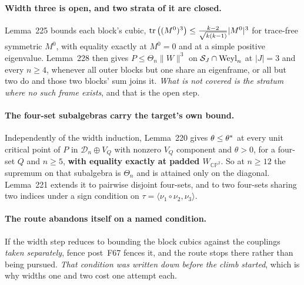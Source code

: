 \paragraph{Width three is open, and two strata of it are closed.} Lemma~225 bounds each block's cubic, $\operatorname{tr}\big((M^0)^3\big)\le\frac{k-2}{\sqrt{k(k-1)}}\lvert M^0\rvert^3$ for trace-free symmetric $M^0$, with equality exactly at $M^0=0$ and at a simple positive eigenvalue. Lemma~228 then gives $P\le\Theta_n\lVert W\rVert^3$ on $\mathcal S_J\cap\mathrm{Weyl}_n$ at $\lvert J\rvert=3$ and every $n\ge4$, whenever all outer blocks but one share an eigenframe, or all but two do and those two blocks' sum joins it. \emph{What is not covered is the stratum where no such frame exists}, and that is the open step.

\paragraph{The four-set subalgebras carry the target's own bound.} Independently of the width induction, Lemma~220 gives $\theta\le\theta^{*}$ at every unit critical point of $P$ in $\mathcal D_n\oplus V_Q$ with nonzero $V_Q$ component and $\theta>0$, for a four-set $Q$ and $n\ge5$, \textbf{with equality exactly at padded $W_{\mathbb{CP}^2}$}. So at $n\ge12$ the supremum on that subalgebra is $\Theta_n$ and is attained only on the diagonal. Lemma~221 extends it to pairwise disjoint four-sets, and to two four-sets sharing two indices under a sign condition on $\tau=\langle\nu_1\circ\nu_2,\nu_3\rangle$.

\paragraph{The route abandons itself on a named condition.} If the width step reduces to bounding the block cubics against the couplings \emph{taken separately}, fence post~F67 fences it, and the route stops there rather than being pursued. \emph{That condition was written down before the climb started}, which is why widths one and two cost one attempt each.

